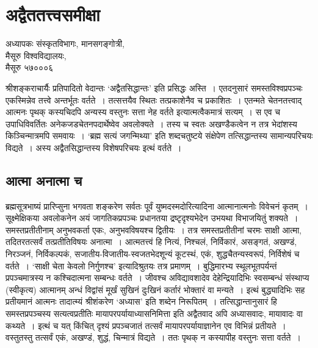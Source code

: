 {\fontsize{15}{17}\selectfont
\chapter{अद्वैततत्त्वसमीक्षा}

\begin{center}
\smallskip
अध्यापकः संस्कृतविभागः, मानसगङ्गोत्री,\\
मैसूरु विश्वविद्यालयः,\\
मैसूरु ५७०००६
\addrule
\end{center}
श्रीशङ्कराचार्यैः प्रतिपादितो वेदान्तः ‘अद्वैतसिद्धान्तः’ इति प्रसिद्धः अस्ति~। एतदनुसारं समस्तविश्वप्रपञ्चः एकस्मिन्नेव तत्त्वे अन्तर्भूतः वर्तते~। तत्सत्तयैव स्थितः तत्प्रकाशेनैव च प्रकाशितः~। एतन्मते चेतनतत्त्वाद् आत्मनः पृथक् कस्यचिदपि अन्यस्य वस्तुनः सत्ता नेह वर्तते इत्यात्मत्वैकमात्रं सत्यम्~। स एव च उपाधिविवर्तितः अनेकजडचेतनपदार्थेष्वेव अवलोक्यते~। तस्य च स्वतः अखण्डैकत्वेन न तत्र भेदांशस्य किञ्चिन्मात्रमपि समवायः~। ‘ब्रह्म सत्यं जगन्मिथ्या’ इति शब्दचतुष्टये संक्षेपेण तत्सिद्धान्तस्य सामान्यपरिचयः विद्यते~। अस्य अद्वैतसिद्धान्तस्य विशेषपरिचयः इत्थं वर्तते~। 

\section*{आत्मा अनात्मा च}

ब्रह्मसूत्रभाष्यं प्रारिप्सुना भगवता शङ्करेण सर्वतः पूर्वं युष्मदस्मदोरित्यादिना आत्मानात्मनोः विवेचनं कृतम्~। सूक्ष्मेक्षिकया अवलोकनेन अयं जागतिकप्रपञ्चः प्रधानतया द्रष्टृदृश्यभेदेन उभयथा विभाजयितुं शक्यते~। समस्तप्रतीतीनाम् अनुभवकर्ता एकः, अनुभवविषयश्च द्वितीयः~। तत्र समस्तप्रतीतीनां चरमः साक्षी आत्मा, तदितरतत्सर्वं तत्प्रतीतिविषयः अनात्मा~। आत्मतत्त्वं हि नित्यं, निश्चलं, निर्विकारं, असङ्गतं, अखण्डं, निरञ्जनं, निर्विकल्पकं, सजातीय-विजातीय-स्वजतभेदशून्यं कूटस्थं, एकं, शुद्धचैतन्यस्वरूपं, निर्विशेषं च वर्तते~। ‘साक्षी चेता केवलो निर्गुणश्च’ इत्यादिश्रुतयः तत्र प्रमाणम्~। बुद्धिमारभ्य स्थूलभूतपर्यन्तं प्रपञ्चमात्रस्य न कश्चिदात्मना सम्बन्धः वर्तते~। जीवश्च अविद्यावशादेव देहेन्द्रियादिभिः स्वसम्बन्धं संस्थाप्य (स्वीकृत्य) आत्मानम् अन्धं विद्वांसं मूर्खं सुखिनं दुःखिनं कर्तारं भोक्तारं वा मन्यते~। इत्थं बुद्ध्यादिभिः सह प्रतीयमानं आत्मनः तादात्म्यं श्रीशंकरेण ‘अध्यास’ इति शब्देन निरूपितम्~। तत्सिद्धान्तानुसारं हि समस्तप्रपञ्चस्य सत्यत्वप्रतीतिः मायापरपर्यायाध्यासनिमित्ता इति अद्वैतवाद अपि अध्यासवादः, मायावादः वा कथ्यते~। इत्थं च यत् किंचित् दृश्यं प्रपञ्चजातं तत्सर्वं मायापरपर्यायाज्ञानेन एव विभिन्नं प्रतीयते~। वस्तुतस्तु तत्सर्वं एकं, अखण्डं, शुद्धं, चिन्मात्रं विद्यते~। ततः पृथक् न कस्यापीह वस्तुनः सत्ता वर्तते~। 

}
